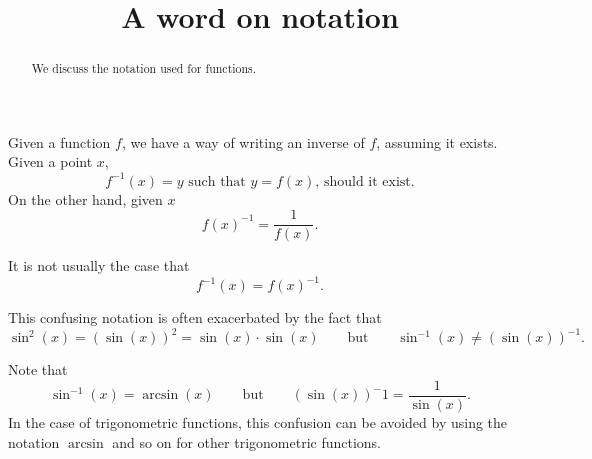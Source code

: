 \documentclass{ximera}
\title{A word on notation}
\begin{document}
\begin{abstract}
  We discuss the notation used for functions.
\end{abstract}
\maketitle

Given a function $f$, we have a way of writing an inverse of $f$,
assuming it exists. Given a point $x$, 
\[
f^{-1}(x) = \text{$y$ such that $y = f(x)$, should it exist.}
\]
On the other hand, given $x$
\[
f(x)^{-1} = \frac{1}{f(x)}.
\]
\begin{warning}
It is not usually the case that 
\[
f^{-1}(x) = f(x)^{-1}.
\]
\end{warning}

This confusing notation is often exacerbated by the fact that 
\[
\sin^2(x) = (\sin(x))^2=\sin(x)\cdot \sin(x)\qquad \text{but} \qquad \sin^{-1}(x)
\ne(\sin(x))^{-1}.
\]

\begin{warning}
  Note that 
  \[
  \sin^{-1}(x)=\arcsin(x)\qquad\text{but}\qquad (\sin(x))^-1 = \frac
  {1}{\sin(x)}.
  \]
  In the case of trigonometric functions, this confusion can be avoided
  by using the notation $\arcsin$ and so on for other trigonometric
  functions.
\end{warning}
\end{document}
